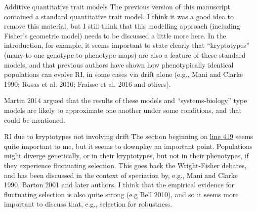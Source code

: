 \begin{point}{Additive quantitative trait models}
%
The previous version of this manuscript contained a standard quantitative trait model. I think it was a good idea to remove this material, but I still think that this modelling approach (including Fisher’s geometric model) needs to be discussed a little more here. In the introduction, for example, it seems important to state clearly that ``kryptotypes'' (many-to-one genotype-to-phenotype maps) are also a feature of these standard models, and that previous authors have shown how phenotypically identical populations can evolve RI, in some cases via drift alone (e.g., Mani and Clarke 1990; Rosas et al. 2010; Fraisse et al. 2016 and others).

Martin 2014 argued that the results of these models and ``systems-biology'' type models are likely to approximate one another under some conditions, and that could be mentioned.
\end{point}


\begin{point}{RI due to kryptotypes not involving drift}
%
  The section beginning on \hyperlink{rev1:4}{line 419} seems quite important to me, but it seems to downplay an important point. Populations might diverge genetically, or in their kryptotypes, but not in their phenotypes, if they experience fluctuating selection. This goes back the Wright-Fisher debates, and has been discussed in the context of speciation by, e.g., Mani and Clarke 1990, Barton 2001 and later authors. I think that the empirical evidence for fluctuating selection is also quite strong (e.g Bell 2010), and so it seems more important to discuss that, e.g., selection for robustness.
\end{point}


